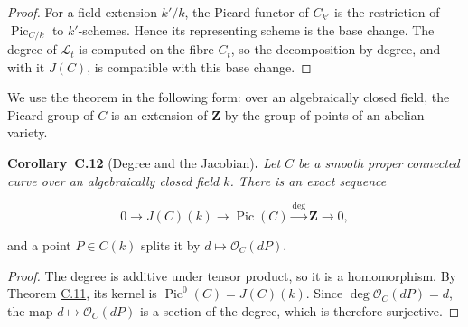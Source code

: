 \documentclass[11pt]{article}
\newenvironment{bpstatement}[2]{\par\addvspace{0.6\baselineskip}\noindent\textbf{#1}#2\textbf{.}\enspace\ignorespaces}
  {\par\addvspace{0.4\baselineskip}}
\newenvironment{bpstatementit}[2]{\begin{bpstatement}{#1}{#2}\itshape\ignorespaces}{\end{bpstatement}}
\begin{document}
\begin{proof}[{Proof}]
For a field extension \(k'/k\), the Picard functor of \(C_{k'}\) is the restriction of \(\operatorname{Pic}_{C/k}\) to \(k'\)-schemes. Hence its representing scheme is the base change. The degree of \(\mathcal L_t\) is computed on the fibre \(C_t\), so the decomposition by degree, and with it \(J(C)\), is compatible with this base change.
\end{proof}

\label{bp38}%
We use the theorem in the following form: over an algebraically closed field, the Picard group of \(C\) is an extension of \(\mathbf Z\) by the group of points of an abelian variety.

\label{bp39}%
\begin{bpstatementit}{Corollary~C.12}{ (Degree and the Jacobian)}
Let \(C\) be a smooth proper connected curve over an algebraically closed field \(k\). There is an exact sequence

\[
0\longrightarrow J(C)(k)
\longrightarrow\operatorname{Pic}(C)
\xrightarrow{\deg}\mathbf Z\longrightarrow0,
\]

and a point \(P\in C(k)\) splits it by \(d\mapsto\mathcal O_C(dP)\).
\end{bpstatementit}

\begin{proof}[{Proof}]\label{bp40}%
The degree is additive under tensor product, so it is a homomorphism. By Theorem \hyperref[bp36]{C.11}, its kernel is \(\operatorname{Pic}^0(C)=J(C)(k)\). Since \(\deg\mathcal O_C(dP)=d\), the map \(d\mapsto\mathcal O_C(dP)\) is a section of the degree, which is therefore surjective.
\end{proof}
\end{document}
